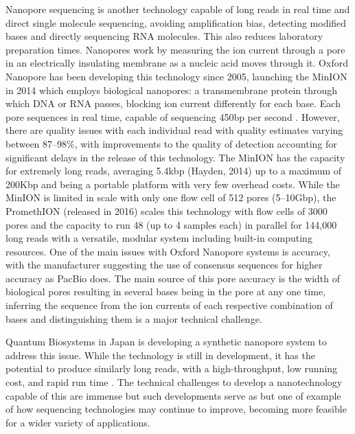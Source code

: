 Nanopore sequencing is another technology capable of long reads in real time and direct single molecule sequencing, avoiding amplification bias, detecting modified bases and directly sequencing \acrshort{RNA} molecules. This also reduces laboratory preparation times. Nanopores work by measuring the ion current through a pore in an electrically insulating membrane as a nucleic acid moves through it. Oxford Nanopore has been developing this technology since 2005, launching the MinION in 2014 which employs biological nanopores: a transmembrane protein through which \acrshort{DNA} or \acrshort{RNA} passes, blocking ion current differently for each base. Each pore sequences in real time, capable of sequencing 450bp per second \citep{nanoporetech}. However, there are quality issues with each individual read with quality estimates varying between 87--98\%, with improvements to the quality of detection accounting for significant delays in the release of this technology. The MinION has the capacity for extremely long reads, averaging 5.4kbp (Hayden, 2014) up to a maximum of 200Kbp and being a portable platform with very few overhead costs. While the MinION is limited in scale with only one flow cell of 512 pores (5--10Gbp), the PromethION (released in 2016) scales this technology with flow cells of 3000 pores and the capacity to run 48 (up to 4 samples each) in parallel for 144,000 long reads with a versatile, modular system including built-in computing resources. One of the main issues with Oxford Nanopore systems is accuracy, with the manufacturer suggesting the use of consensus sequences for higher accuracy as PacBio does. The main source of this pore accuracy is the width of biological pores resulting in several bases being in the pore at any one time, inferring the sequence from the ion currents of each respective combination of bases and distinguishing them is a major technical challenge.

Quantum Biosystems in Japan is developing a synthetic nanopore system to address this issue. While the technology is still in development, it has the potential to produce similarly long reads, with a high-throughput, low running cost, and rapid run time \citep{quantumbiosystems}. The technical challenges to develop a nanotechnology capable of this are immense but such developments serve as but one of example of how sequencing technologies may continue to improve, becoming more feasible for a wider variety of applications.

\fi



